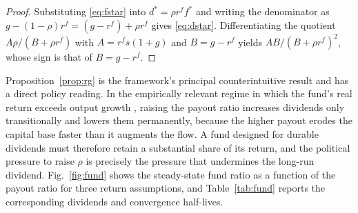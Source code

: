 \documentclass[journal]{IEEEtran}
\theoremstyle{plain}
\theoremstyle{definition}
\begin{document}
\begin{proof}
Substituting \eqref{eq:fstar} into $d^{*} = \rho r^{f} f^{*}$ and writing the denominator as $g-(1-\rho)r^{f} = (g-r^{f})+\rho r^{f}$ gives \eqref{eq:dstar}. Differentiating the quotient $A\rho/(B+\rho r^{f})$ with $A = r^{f}s(1+g)$ and $B = g-r^{f}$ yields $AB/(B+\rho r^{f})^{2}$, whose sign is that of $B = g - r^{f}$.
\end{proof}

Proposition~\ref{prop:rg} is the framework's principal counterintuitive result and has a direct policy reading. In the empirically relevant regime in which the fund's real return exceeds output growth \cite{Piketty2014}, raising the payout ratio increases dividends only transitionally and lowers them permanently, because the higher payout erodes the capital base faster than it augments the flow. A fund designed for durable dividends must therefore retain a substantial share of its return, and the political pressure to raise $\rho$ is precisely the pressure that undermines the long-run dividend. Fig.~\ref{fig:fund} shows the steady-state fund ratio as a function of the payout ratio for three return assumptions, and Table~\ref{tab:fund} reports the corresponding dividends and convergence half-lives.
\end{document}
